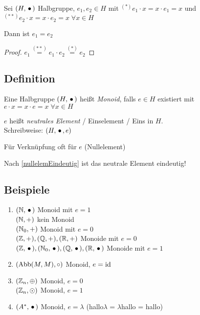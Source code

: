  Sei $(H, \,{\bullet}\,)$ Halbgruppe, $e_1, e_2 \in H$ mit 
 $^{(*)} e_1 \cdot x = x \cdot e_1 = x$ und $^{(**)} e_2 \cdot x = x \cdot e_2 = x \; \forall x \in H$

 Dann ist $e_1 = e_2$
 
 \begin{proof}
 $e_1 \stackrel{(**)}{=} e_1 \cdot e_2 \stackrel{(*)}{=} e_2$
 \end{proof} 
 
 \subsection[Definition: Monoid]{Definition}
 
 Eine Halbgruppe $(H, \,{\bullet}\,)$ heißt \emph{Monoid}, falls $e \in H$ existiert mit $e\cdot x = x \cdot e = x \; \forall x \in H$
 
 $e$ heißt \emph{neutrales Element} / Einselement / Eins in $H$.
 \\Schreibweise: $(H, \,{\bullet}\,, e)$
 
 Für  Verknüpfung oft  für $e$ (Nullelement)
 
 Nach \ref{nullelemEindeutig} ist das neutrale Element eindeutig!
 
 \subsection{Beispiele}
 
 \begin{enumerate}

	\item
	$(\mathbb{N}, \,{\bullet}\,)$ Monoid mit $e=1$
	\\$(\mathbb{N}, +)$ kein Monoid
	\\$(\mathbb{N}_0, +)$ Monoid mit $e=0$
	\\$(\mathbb{Z}, +), (\mathbb{Q}, +), (\mathbb{R}, +)$ Monoide mit $e=0$
	\\$(\mathbb{Z}, \,{\bullet}\,), (\mathbb{N}_0, \,{\bullet}\,), (\mathbb{Q}, \,{\bullet}\,), (\mathbb{R}, \,{\bullet}\,)$ Monoide mit $e=1$
	
	\item
	$(\mathrm{ Abb }(M, M), \circ)$ Monoid, $e = \mathrm{ id }$
	
	\item
	$(\mathbb{Z}_n, \oplus)$ Monoid, $e=0$
	\\ $(\mathbb{Z}_n, \odot)$ Monoid, $e=1$
	
	\item
	$(A^*, \,{\bullet}\,)$ Monoid, $e= \lambda$ (hallo$\lambda$ = $\lambda$hallo = hallo)

 \end{enumerate}
 
